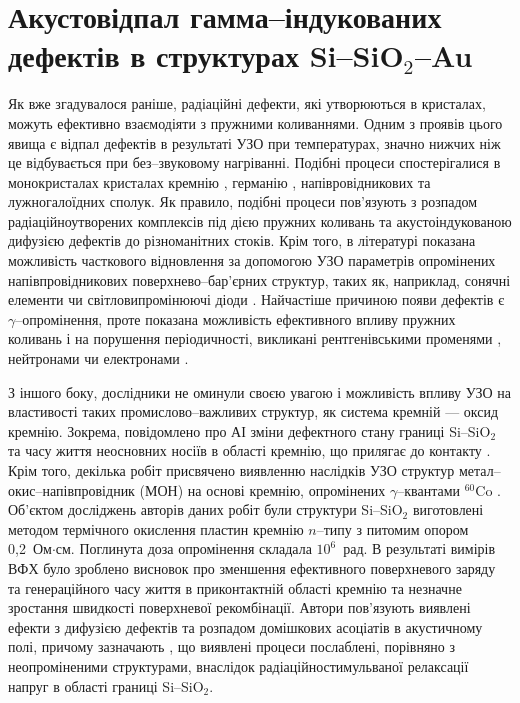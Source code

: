 \documentclass[a4paper,14pt,oneside,openany]{memoir}
\begin{document}
\section{Акустовідпал гамма--індукованих дефектів в структурах Si--SiO$_2$--Au}

Як вже згадувалося раніше, радіаційні дефекти, які утворюються в кристалах, можуть ефективно взаємодіяти з пружними коливаннями.
Одним з проявів цього явища є відпал дефектів в результаті УЗО при температурах, значно нижчих ніж це відбувається при без--звуковому нагріванні.
Подібні процеси спостерігалися в монокристалах кристалах кремнію \cite{OstrovRadSi,Podolian2012r,PodolHivr,YOlikh2007TPLr}, германію \cite{Olikh:FTP1996},
напівровідникових \cite{OlikhProc,OstrovFTTRad} та лужногалоїдних \cite{UST:OstrovCsI} сполук.
Як правило, подібні процеси пов'язують з розпадом радіаційноутворених комплексів під дією пружних коливань та акустоіндукованою дифузією дефектів до різноманітних стоків.
Крім того, в літературі показана можливість часткового відновлення за допомогою УЗО параметрів опромінених напівпровідникових поверхнево--бар'єрних структур, таких як, наприклад,
сонячні елементи \cite{YOlikh2007TPLr} чи світловипромінюючі діоди \cite{US:LED,UST:LED_SM}.
Найчастіше причиною появи дефектів є $\gamma$--опромінення, проте показана можливість ефективного впливу пружних коливань і на порушення періодичності, викликані
рентгенівськими променями \cite{UST:OstrovCsI}, нейтронами \cite{Olikh:FTP1996} чи електронами \cite{US:LED,UST:LED_SM}.

З іншого боку, дослідники не оминули своєю увагою і можливість впливу УЗО на властивості таких промислово--важливих структур, як система
кремній --- оксид кремнію.
Зокрема, повідомлено про АІ зміни дефектного стану границі  Si--SiO$_2$ \cite{Ostap:SiO2,UST:Medvid,Zaver:2008r} та часу життя неосновних носіїв в області кремнію,
що прилягає до контакту \cite{Parchinskii2003r}.
Крім того, декілька робіт присвячено виявленню наслідків УЗО структур метал--окис--напівпровідник (МОН) на основі кремнію, опромінених $\gamma$--квантами $^{60}$Co \cite{Parchinskii2000r,Parchinskii2006r}.
Об'єктом досліджень авторів даних робіт були структури Si--SiO$_2$ виготовлені методом термічного окислення пластин кремнію $n$--типу з питомим опором 0,2~Ом$\cdot$см.
Поглинута доза опромінення складала $10^6$~рад.
В результаті вимірів ВФХ було зроблено висновок про зменшення ефективного поверхневого заряду та генераційного часу життя в приконтактній області кремнію та незначне
зростання швидкості поверхневої рекомбінації.
Автори пов'язують виявлені ефекти з дифузією дефектів та розпадом домішкових асоціатів в акустичному полі, причому зазначають , що виявлені процеси
послаблені, порівняно з неопроміненими структурами, внаслідок радіаційностимульваної релаксації напруг в області границі Si--SiO$_2$.
\end{document}
